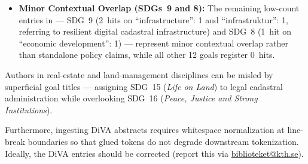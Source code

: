 \begin{casestudySection}
\begin{itemize}
    \item \textbf{Minor Contextual Overlap (\glspl{SDG}~9 and 8):} The remaining low-count entries in  --- \gls{SDG}~9 (\num{2}~hits on \enquote{infrastructure}: 1 and \enquote{\foreignlanguage{swedish}{infrastruktur}}: 1, referring to resilient digital cadastral infrastructure) and \gls{SDG}~8 (\num{1}~hit on \enquote{economic development}: 1) --- represent minor contextual overlap rather than standalone policy claims, while all other \num{12} goals register \num{0}~hits.
\end{itemize}
\end{casestudySection}

\begin{takeaway}
Authors in real-estate and land-management disciplines can be misled by superficial goal titles --- assigning \gls{SDG}~15 (\emph{Life on Land}) to legal cadastral administration while overlooking \gls{SDG}~16 (\emph{Peace, Justice and Strong Institutions}). 
\medskip

Furthermore, ingesting \gls{DiVA} abstracts requires whitespace normalization at line-break boundaries so that glued tokens do not degrade downstream tokenization.
Ideally, the \gls{DiVA} entries should be corrected (report this via \href{mailto:biblioteket@kth.se}{biblioteket@kth.se}).
\end{takeaway}

